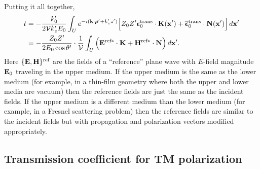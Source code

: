 \documentclass[letterpaper]{article}
\newcommand{\vbEps}{\boldsymbol{\epsilon}}
\begin{document}
Putting it all together, 
\begin{align}
 t
&=-\frac{k_0^\prime}{2\mc V k_z^\prime E_0}
   \int_U e^{-i(\vb k \cdot \vbrho^\prime + k_z^\prime z^\prime)}
        \Big[ Z_0 Z^\prime \vbEps_0\sups{trans} \cdot \vb K(\vb x^\prime)
                +\overline{\vbEps}_0\sups{trans} \cdot \vb N(\vb x^\prime)
        \Big] \, d\vb x^\prime
\\
&=-\frac{Z_0 Z^\prime}{2E_0 \cos \theta^\prime}
   \cdot \frac{1}{\mc V}
   \int_U \Big(  \vb E^{\text{\scriptsize{ref}}*}\cdot \vb K
                +\vb H^{\text{\scriptsize{ref}}*}\cdot \vb N
          \Big) \, d\vb x^\prime.
\label{TFromKN}
\end{align}
Here $\{\mathbf{E},\mathbf{H}\}^{\hbox{\scriptsize{ref}}}$ are the fields of a 
``reference'' plane wave with $E$-field magnitude $\mathbf{E}_0$
traveling in the upper medium. If the upper medium is the
same as the lower medium (for example, in a thin-film geometry
where both the upper and lower media are vacuum) then
the reference fields are just the same as the incident
fields. 
If the upper medium is a different medium than the lower medium
(for example, in a Fresnel scattering problem) then the 
reference fields are similar to the incident fields
but with propagation and polarization vectors modified 
appropriately.


\subsection*{Transmission coefficient for TM polarization}
\end{document}
